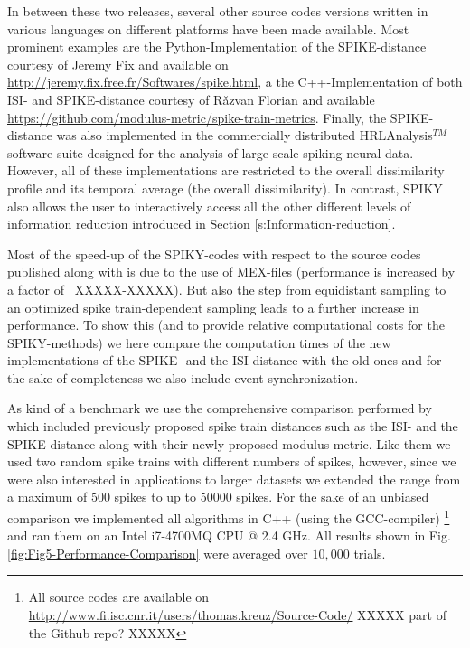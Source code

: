 \documentclass[10pt,twocolumn]{elsart5p}
\begin{document}
In between these two releases, several other source codes versions written in various languages on different platforms have been made available. Most prominent examples are the Python-Implementation of the SPIKE-distance courtesy of Jeremy Fix and available on \url{http://jeremy.fix.free.fr/Softwares/spike.html}, a the C++-Implementation of both ISI- and SPIKE-distance courtesy of R{\v a}zvan Florian and available \url{https://github.com/modulus-metric/spike-train-metrics}. Finally, the SPIKE-distance was also implemented in the commercially distributed HRLAnalysis$^{TM}$ software suite \citep{Thibeault14} designed for the analysis of large-scale spiking neural data. However, all of these implementations are restricted to the overall dissimilarity profile and its temporal average (the overall dissimilarity). In contrast, SPIKY also allows the user to interactively access all the other different levels of information reduction introduced in Section \ref{s:Information-reduction}.


Most of the speed-up of the SPIKY-codes with respect to the source codes published along with \citet{Kreuz13} is due to the use of MEX-files (performance is increased by a factor of ~XXXXX-XXXXX). But also the step from equidistant sampling to an optimized spike train-dependent sampling leads to a further increase in performance. To show this (and to provide relative computational costs for the SPIKY-methods) we here compare the computation times of the new implementations of the SPIKE- and the ISI-distance with the old ones and for the sake of completeness we also include event synchronization.

As kind of a benchmark we use the comprehensive comparison performed by \cite{Rusu14} which included previously proposed spike train distances such as the ISI- and the SPIKE-distance along with their newly proposed modulus-metric. Like them we used two random spike trains with different numbers of spikes, however, since we were also interested in applications to larger datasets we extended the range from a maximum of $500$ spikes to up to $50000$ spikes. For the sake of an unbiased comparison we implemented all algorithms in C++ (using the GCC-compiler) \footnote{All source codes are available on \url{http://www.fi.isc.cnr.it/users/thomas.kreuz/Source-Code/} XXXXX part of the Github repo? XXXXX} and ran them on an Intel i7-4700MQ CPU @ 2.4 GHz. All results shown in Fig. \ref{fig:Fig5-Performance-Comparison} were averaged over $10,000$ trials.
\end{document}
